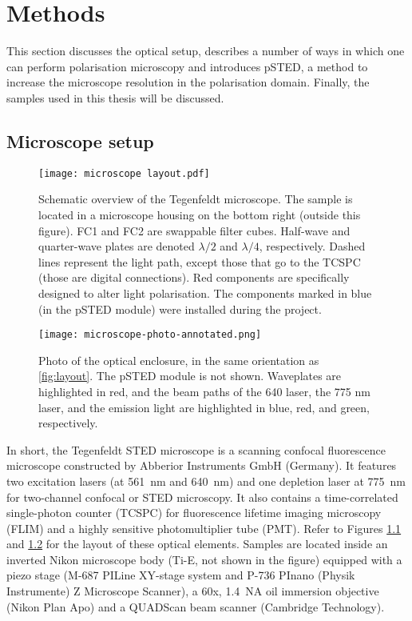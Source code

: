 \chapter{Methods}

This section discusses the optical setup, describes a number of ways in which one can perform polarisation microscopy and introduces pSTED, a method to increase the microscope resolution in the polarisation domain. Finally, the samples used in this thesis will be discussed.

\section{Microscope setup}

\begin{figure}[h!]
	\centering
	\texttt{[image: microscope layout.pdf]}
	\caption{
		Schematic overview of the Tegenfeldt microscope. The sample is located in a microscope housing on the bottom right (outside this figure). FC1 and FC2 are swappable filter cubes. Half-wave and quarter-wave plates are denoted $ \lambda/2 $ and $ \lambda/4 $, respectively. Dashed lines represent the light path, except those that go to the TCSPC (those are digital connections). Red components are specifically designed to alter light polarisation. The components marked in blue (in the pSTED module) were installed during the project.
	}
	\label{fig:layout}
\end{figure}

\begin{figure}
	\centering
	\texttt{[image: microscope-photo-annotated.png]}
	\caption{
		Photo of the optical enclosure, in the same orientation as \autoref{fig:layout}. The pSTED module is not shown. Waveplates are highlighted in red, and the beam paths of the 640 laser, the 775 nm laser, and the emission light are highlighted in blue, red, and green, respectively.
	}
	\label{fig:microscope photo}
\end{figure}

In short, the Tegenfeldt STED microscope is a scanning confocal fluorescence microscope constructed by Abberior Instruments GmbH (Germany). It features two excitation lasers (at 561~nm and 640~nm) and one depletion laser at 775~nm for two-channel confocal or STED microscopy. It also contains a time-correlated single-photon counter (TCSPC) for fluorescence lifetime imaging microscopy (FLIM) and a highly sensitive photomultiplier tube (PMT). Refer to Figures \ref{fig:layout} and \ref{fig:microscope photo} for the layout of these optical elements. Samples are located inside an inverted Nikon microscope body (Ti-E, not shown in the figure) equipped with a piezo stage (M-687 PILine XY-stage system and P-736 PInano (Physik Instrumente) Z Microscope Scanner), a 60x, 1.4~NA oil immersion objective (Nikon Plan Apo) and a QUADScan beam scanner (Cambridge Technology).

